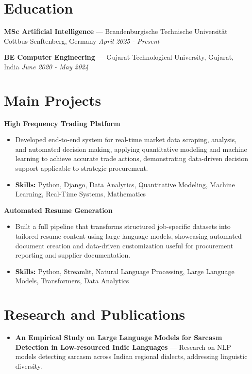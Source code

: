 \documentclass[a4paper,10pt]{article}
\begin{document}
\section*{Education}
\textbf{MSc Artificial Intelligence} — Brandenburgische Technische Universität Cottbus-Senftenberg, Germany \hfill \textit{April 2025 - Present}\par
\vspace{1.5pt}
\textbf{BE Computer Engineering} — Gujarat Technological University, Gujarat, India \hfill \textit{June 2020 - May 2024}\par

\section*{Main Projects}
\textbf{High Frequency Trading Platform}\par
\vspace{1pt}
\begin{itemize}
  \item Developed end-to-end system for real-time market data scraping, analysis, and automated decision making, applying quantitative modeling and machine learning to achieve accurate trade actions, demonstrating data-driven decision support applicable to strategic procurement.
  \item \textbf{Skills:} Python, Django, Data Analytics, Quantitative Modeling, Machine Learning, Real-Time Systems, Mathematics
\end{itemize}
\vspace{3pt}
\textbf{Automated Resume Generation}\par
\vspace{1pt}
\begin{itemize}
  \item Built a full pipeline that transforms structured job-specific datasets into tailored resume content using large language models, showcasing automated document creation and data-driven customization useful for procurement reporting and supplier documentation.
  \item \textbf{Skills:} Python, Streamlit, Natural Language Processing, Large Language Models, Transformers, Data Analytics
\end{itemize}

\section*{Research and Publications}
\begin{itemize}
\item \textbf{An Empirical Study on Large Language Models for Sarcasm Detection in Low-resourced Indic Languages} — Research on NLP models detecting sarcasm across Indian regional dialects, addressing linguistic diversity.
\end{itemize}
\end{document}
